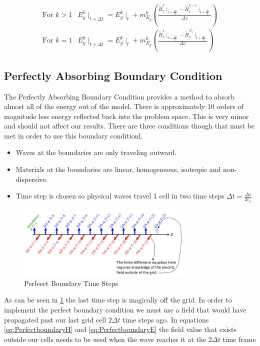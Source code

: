 \documentclass[a4paper,10pt]{article}
\begin{document}
\begin{eqnarray*}
  \mbox{For } k > 1 & E_{y}^{k}\mid_{t+\Delta t} = E_{y}^{k}\mid_{t} + m_{E_y}^{k}\left(\frac{\tilde{H}_{x}^{k}\mid_{t+\frac{\Delta t}{2}} - \tilde{H}_{x}^{k-1}\mid_{t+\frac  {\Delta t}{2}}}{\Delta z}\right)\\
  \mbox{For } k = 1 & E_{y}^{k}\mid_{t+\Delta t} = E_{y}^{k}\mid_{t} + m_{E_y}^{k}\left(\frac{\tilde{H}_{x}^{1}\mid_{t+\frac{\Delta t}{2}} - \tilde{H}_{x}^{N_z}\mid_{t+\frac  {\Delta t}{2}}}{\Delta z}\right)
\end{eqnarray*}


\subsection{Perfectly Absorbing Boundary Condition}
The Perfectly Absorbing Boundary Condition provides a method to absorb almost all of the energy out of the model.  There is approximately 10 orders of magnitude less energy reflected back into the problem space.  This is very minor and should not affect our results.  There are three conditions though that must be met in order to use this boundary conditionl.
\begin{itemize}
\item Waves at the boundaries are only traveling outward.
\item Materials at the boundaries are linear, homogeneous, isotropic and non-dispersive.
\item Time step is chosen so physical waves travel 1 cell in two time steps $\Delta t=\frac{\Delta z}{2c_o}$
\end{itemize}

\begin{figure}[ht]
  \label{fig:PerfectBoundary}
   \centering
     \includegraphics[width=0.75\textwidth]{PerfectBoundary.png}
   \caption{Perfeect Boundary Time Steps}
\end{figure}

As can be seen in \ref{fig:PerfectBoundary} the last time step is magically off the grid.  In order to implement the perfect boundary condition we must use a field that would have propagated past our last grid cell $2\Delta t$ time steps ago.   In equations \eqref{eq:PerfectboundaryH} and \eqref{eq:PerfectboundaryE} the field value that exists outside our cells needs to be used when the wave reaches it at the $2\Delta t$ time frame
\end{document}
